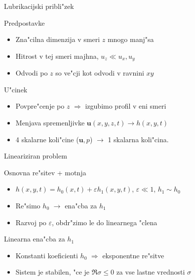 \documentclass{beamer}
\renewcommand{\vec}{\mathbf}
\begin{document}
\begin{frame}{Lubrikacijski pribli"zek}
 \begin{block}{Predpostavke}
  \begin{itemize}
   \item Zna"cilna dimenzija v smeri $z$ mnogo manj"sa
   \item Hitrost v tej smeri majhna, $u_z \ll u_x, u_y$
   \item Odvodi po $z$ so ve"cji kot odvodi v ravnini $xy$
  \end{itemize}
  \end{block}
  
  \begin{block}{U"cinek}
  \begin{itemize}
   \item Povpre"cenje po $z$ $\Rightarrow$ izgubimo profil v eni smeri
   \item Menjava spremenljivke $\vec u(x,y,z,t) \to h(x,y,t)$
   \item 4 skalarne koli"cine ($\vec u, p$) $\to$ 1 skalarna koli"cina. 
   \end{itemize}
 \end{block}
\end{frame}

\begin{frame}{Lineariziran problem}
\begin{block}{Osnovna re"sitev + motnja}
\begin{itemize}
 \item $ h(x,y,t) = h_0(x,t) + \varepsilon h_1(x,y,t) $, \; $\varepsilon \ll 1$, \; $h_1 \sim h_0$
 \item Re"simo $h_0$ $\rightarrow$ ena"cba za $h_1$
 \item Razvoj po $\varepsilon$, obdr"zimo le do linearnega "clena
\end{itemize}
\end{block}

\begin{block}{Linearna ena"cba za $h_1$}
 \begin{itemize}
  \item Konstanti koeficienti $h_0$ $\Rightarrow$ eksponentne re"sitve
  \item Sistem je stabilen, "ce je $\Re \sigma \leq 0$ za vse lastne vrednosti $\sigma$
 \end{itemize}
\end{block}


\end{frame}
\end{document}
